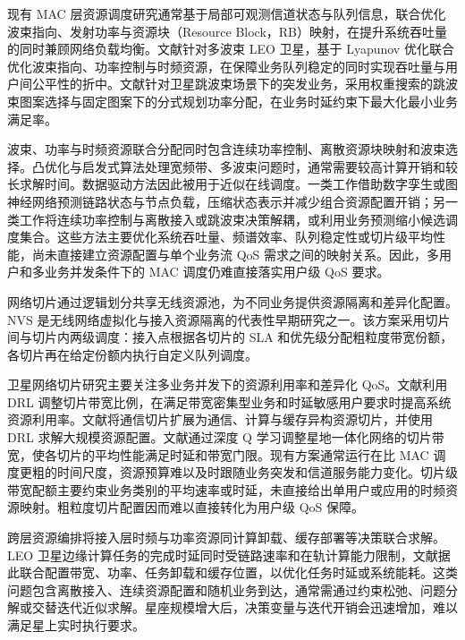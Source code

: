 现有 MAC 层资源调度研究通常基于局部可观测信道状态与队列信息，联合优化波束指向、发射功率与资源块（Resource Block，RB）映射，在提升系统吞吐量的同时兼顾网络负载均衡。文献\cite{yuan-beamControl-TVT24}针对多波束 LEO 卫星，基于 Lyapunov 优化联合优化波束指向、功率控制与时频资源，在保障业务队列稳定的同时实现吞吐量与用户间公平性的折中。文献\cite{rong-beamhoppingpower-TWC24}针对卫星跳波束场景下的突发业务，采用权重搜索的跳波束图案选择与固定图案下的分式规划功率分配，在业务时延约束下最大化最小业务满足率。

波束、功率与时频资源联合分配同时包含连续功率控制、离散资源块映射和波束选择。凸优化与启发式算法处理宽频带、多波束问题时，通常需要较高计算开销和较长求解时间。数据驱动方法因此被用于近似在线调度。一类工作借助数字孪生或图神经网络预测链路状态与节点负载，压缩状态表示并减少组合资源配置开销\cite{zhao-BHPowerLoadBalancing-TWC25,he-ResourceOrestration-IoTJ23}；另一类工作将连续功率控制与离散接入或跳波束决策解耦，或利用业务预测缩小候选调度集合\cite{huang-DRLRSMALEO-TCOM24,zhao-resourceManagement-TCOM23}。这些方法主要优化系统吞吐量、频谱效率、队列稳定性或切片级平均性能，尚未直接建立资源配置与单个业务流 QoS 需求之间的映射关系。因此，多用户和多业务并发条件下的 MAC 调度仍难直接落实用户级 QoS 要求。

网络切片通过逻辑划分共享无线资源池，为不同业务提供资源隔离和差异化配置。NVS 是无线网络虚拟化与接入资源隔离的代表性早期研究之一\cite{kokku-NVS-TON12}。该方案采用切片间与切片内两级调度：接入点根据各切片的 SLA 和优先级分配粗粒度带宽份额，各切片再在给定份额内执行自定义队列调度。

卫星网络切片研究主要关注多业务并发下的资源利用率和差异化 QoS。文献\cite{liu-reconfigurableRAN-TCCN25}利用 DRL 调整切片带宽比例，在满足带宽密集型业务和时延敏感用户要求时提高系统资源利用率。文献\cite{chen-infoLEOSlicing-JSAC24}将通信切片扩展为通信、计算与缓存异构资源切片，并使用 DRL 求解大规模资源配置。文献\cite{Rodrigues-RLSlicing-WirelessCom22}通过深度 Q 学习调整星地一体化网络的切片带宽，使各切片的平均性能满足时延和带宽门限。现有方案通常运行在比 MAC 调度更粗的时间尺度，资源预算难以及时跟随业务突发和信道服务能力变化。切片级带宽配额主要约束业务类别的平均速率或时延，未直接给出单用户或应用的时频资源映射。粗粒度切片配置因而难以直接转化为用户级 QoS 保障。

跨层资源编排将接入层时频与功率资源同计算卸载、缓存部署等决策联合求解。LEO 卫星边缘计算任务的完成时延同时受链路速率和在轨计算能力限制，文献据此联合配置带宽、功率、任务卸载和缓存位置，以优化任务时延或系统能耗\cite{hao-cccResourceAlloc-Access23,ding-computeResourceEDGE-TCOM23}。这类问题包含离散接入、连续资源配置和随机业务到达，通常需通过约束松弛、问题分解或交替迭代近似求解。星座规模增大后，决策变量与迭代开销会迅速增加，难以满足星上实时执行要求。

